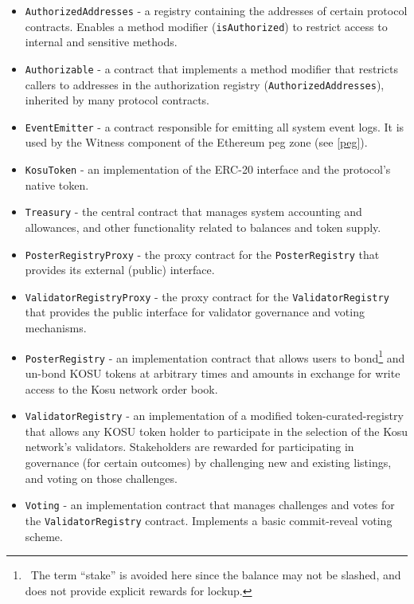 \documentclass[10pt]{article}
\begin{document}
\begin{itemize}
  \item \texttt{AuthorizedAddresses} - a registry containing the addresses of certain protocol contracts. Enables a method modifier (\texttt{isAuthorized}) to restrict access to internal and sensitive methods.
  \item \texttt{Authorizable} - a contract that implements a method modifier that restricts callers to addresses in the authorization registry (\texttt{AuthorizedAddresses}), inherited by many protocol contracts.
  \item \texttt{EventEmitter} - a contract responsible for emitting all system event logs. It is used by the Witness component of the Ethereum peg zone (see \ref{peg}).
  \item \texttt{KosuToken} - an implementation of the ERC-20 interface and the protocol's native token.
  \item \texttt{Treasury} - the central contract that manages system accounting and allowances, and other functionality related to balances and token supply.
  \item \texttt{PosterRegistryProxy} - the proxy contract for the \texttt{PosterRegistry} that provides its external (public) interface.
  \item \texttt{ValidatorRegistryProxy} - the proxy contract for the \texttt{ValidatorRegistry} that provides the public interface for validator governance and voting mechanisms.
  \item \texttt{PosterRegistry} - an implementation contract that allows users to bond\footnote{\ The term ``stake'' is avoided here since the balance may not be slashed, and does not provide explicit rewards for lockup.} and un-bond KOSU tokens at arbitrary times and amounts in exchange for write access to the Kosu network order book. 
  \item \texttt{ValidatorRegistry} - an implementation of a modified token-curated-registry\cite{tcr-1} that allows any KOSU token holder to participate in the selection of the Kosu network's validators. Stakeholders are rewarded for participating in governance (for certain outcomes) by challenging new and existing listings, and voting on those challenges. 
  \item \texttt{Voting} - an implementation contract that manages challenges and votes for the \texttt{ValidatorRegistry} contract. Implements a basic commit-reveal voting scheme.
\end{itemize}
\end{document}
